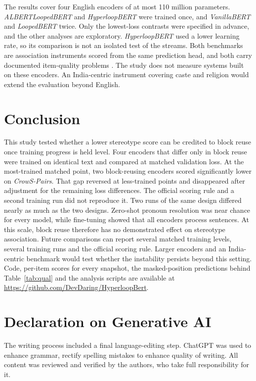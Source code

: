 \documentclass[sigconf,natbib=true]{acmart}
\begin{document}
The results cover four English encoders of at most 110 million parameters.
\emph{ALBERTLoopedBERT} and \emph{HyperloopBERT} were trained once, and
\emph{VanillaBERT} and \emph{LoopedBERT} twice. Only the lowest-loss contrasts
were specified in advance, and the other analyses are exploratory.
\emph{HyperloopBERT} used a lower learning rate, so its comparison is not an
isolated test of the streams. Both benchmarks are association instruments scored
from the same prediction head, and both carry documented item-quality problems
\citep{blodgett2021salmon}. The study does not measure systems built on these
encoders. An India-centric instrument covering caste and religion
\citep{khandelwal2023indianbhed} would extend the evaluation beyond English.

\section{Conclusion}
\label{sec:conclusion}

This study tested whether a lower stereotype score can be credited to block
reuse once training progress is held level. Four encoders that differ only in
block reuse were trained on identical text and compared at matched validation
loss. At the most-trained matched point, two block-reusing encoders scored
significantly lower on \emph{CrowS-Pairs}. That gap reversed at less-trained
points and disappeared after adjustment for the remaining loss differences. The
official scoring rule and a second training run did not reproduce it. Two runs
of the same design differed nearly as much as the two designs. Zero-shot pronoun
resolution was near chance for every model, while fine-tuning showed that all
encoders process sentences. At this scale, block reuse therefore has no
demonstrated effect on stereotype association. Future comparisons can report
several matched training levels, several training runs and the official scoring
rule. Larger encoders and an India-centric benchmark would test whether the
instability persists beyond this setting. Code, per-item scores for every snapshot, the masked-position
predictions behind Table~\ref{tab:qual} and the analysis scripts are available at
\url{https://github.com/DevDaring/HyperloopBert}.

\section*{Declaration on Generative AI}

The writing process included a final language-editing step. ChatGPT was used to
enhance grammar, rectify spelling mistakes to enhance quality of writing. All content
was reviewed and verified by the authors, who take full responsibility for it.



\end{document}
